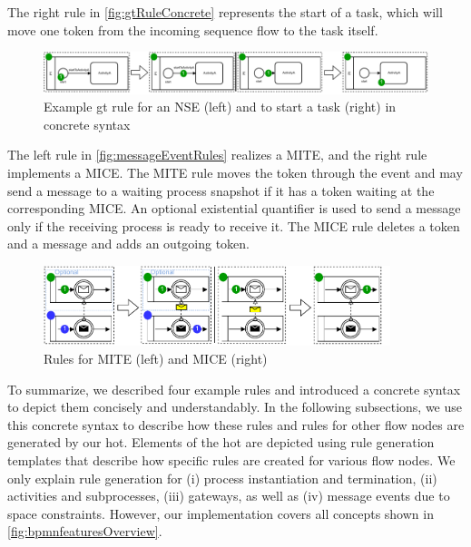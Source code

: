 \documentclass[runningheads]{llncs}
\begin{document}
The right rule in \autoref{fig:gtRuleConcrete} represents the start of a task, which will move one token from the incoming sequence flow to the task itself.

\begin{figure}[ht]
    \centering
  \includegraphics[width=1\textwidth]{images/rule_concrete.pdf}
  \caption{Example \gls*{gt} rule for an NSE (left) and to start a task (right) in concrete syntax}
  \label{fig:gtRuleConcrete}
\end{figure}

The left rule in \autoref{fig:messageEventRules} realizes a MITE, and the right rule implements a MICE.
The MITE rule moves the token through the event and may send a message to a waiting process snapshot if it has a token waiting at the corresponding MICE.
An optional existential quantifier \cite{rensinkNestedQuantificationGraph2006} is used to send a message only if the receiving process is ready to receive it.
The MICE rule deletes a token and a message and adds an outgoing token.

\begin{figure}[ht]
    \centering
    \includegraphics[width=0.9\textwidth]{images/bpmn_semantics-message-events.pdf}
    \caption{Rules for MITE (left) and MICE (right)}
    \label{fig:messageEventRules}
\end{figure}

To summarize, we described four example rules and introduced a concrete syntax to depict them concisely and understandably.
In the following subsections, we use this concrete syntax to describe how these rules and rules for other flow nodes are generated by our \gls*{hot}.
Elements of the \gls*{hot} are depicted using rule generation templates that describe how specific rules are created for various flow nodes.
We only explain rule generation for (i) process instantiation and termination, (ii) activities and subprocesses, (iii) gateways, as well as (iv) message events due to space constraints.
However, our implementation covers all concepts shown in \autoref{fig:bpmnfeaturesOverview}.
\end{document}

